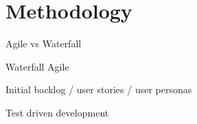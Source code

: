 \section{Methodology}

Agile vs Waterfall

Waterfall
Agile

Initial backlog / user stories / user personas

Test driven development
